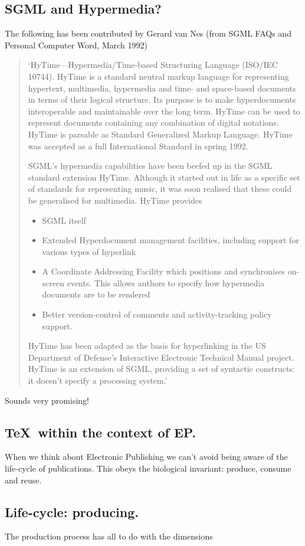 \subsection{SGML and Hypermedia?} The following has been contributed
by Gerard van Nes (from SGML FAQs and
Personal Computer Word, March 1992)
\begin{quote}
`HyTime---Hypermedia/Time-based Structuring Language (ISO/IEC 10744).
HyTime is a standard neutral markup language for representing hypertext,
multimedia, hypermedia and time- and space-based documents in terms of their
logical structure. Its purpose is to make hyperdocuments interoperable
and maintainable over the long term. HyTime can be used to represent
documents containing any combination of digital notations. HyTime is
parsable as Standard Generalized Markup Language.
HyTime was accepted as a full International Standard in spring 1992.

SGML's hypermedia capabilities have been beefed up in the SGML standard
extension HyTime. Although it started out in life as a specific set of
standards for representing music, it was soon realised that these could
be generalised for multimedia. HyTime provides
\begin{itemize}
\item SGML itself
\item Extended Hyperdocument management facilities, including support for
  various types of hyperlink
\item A Coordinate Addressing Facility which positions and synchronises
  on-screen events. This allows authors to specify how hypermedia
  documents are to be rendered
\item Better version-control of comments and activity-tracking policy support.
\end{itemize}
HyTime has been adapted as the basis for hyperlinking in the US
Department of Defense's Interactive Electronic Technical Manual project.
HyTime is an extension of SGML, providing a set of syntactic constructs:
it doesn't specify a processing system.'
\end{quote}
\noindent Sounds very promising!


\subsection{\TeX\ within the context of EP.}
When we think about Electronic Publishing we can't avoid being
aware of the life-cycle of publications.
This obeys the biological invariant: produce, consume and reuse.
\subsection*{Life-cycle: producing.}
The production process has all to do with the dimensions

